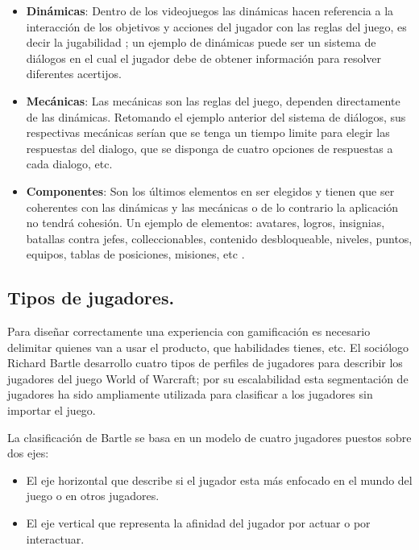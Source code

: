 	\begin{itemize}
		\item \textbf{Dinámicas}: Dentro de los videojuegos las dinámicas hacen 
		referencia a la interacción de los objetivos y acciones del jugador con las 
		reglas del juego, es decir la jugabilidad \cite{RefMecanica}; un ejemplo de 
		dinámicas puede ser un sistema de diálogos en el cual el jugador debe de 
		obtener información para resolver diferentes acertijos.

		\item \textbf{Mecánicas}: Las mecánicas son las reglas del juego, dependen 
		directamente de las dinámicas\cite{RefMecanica}. Retomando el ejemplo anterior 
		del sistema de diálogos, sus respectivas mecánicas serían que se tenga un 
		tiempo limite para elegir las respuestas del dialogo, que se disponga de cuatro 
		opciones de respuestas a cada dialogo, etc.

		\item \textbf{Componentes}: Son los últimos elementos en ser elegidos y 
		tienen que ser coherentes con las dinámicas y las mecánicas o de lo contrario 
		la aplicación no tendrá cohesión. Un ejemplo de elementos: avatares, logros, 
		insignias, batallas contra jefes, colleccionables, contenido desbloqueable, 
		niveles, puntos, equipos, tablas de posiciones, misiones, etc 
		\cite{RefIntroGamificacion}.
	\end{itemize}

\subsection{Tipos de jugadores.}
Para diseñar correctamente una experiencia con gamificación es necesario 
delimitar quienes van a usar el producto, que habilidades tienes, etc. El 
sociólogo Richard Bartle desarrollo cuatro tipos de perfiles de jugadores para 
describir los jugadores del juego World of Warcraft; por su escalabilidad esta 
segmentación de jugadores ha sido ampliamente utilizada para clasificar a los 
jugadores sin importar el juego.
\\
\par
La clasificación de Bartle se basa en un modelo de cuatro jugadores puestos sobre 
dos ejes: 
\begin{itemize}
	\item El eje horizontal que describe si el jugador esta más enfocado en el mundo 
	del juego o en otros jugadores.

	\item El eje vertical que representa la afinidad del jugador por actuar o 
	por interactuar.
\end{itemize}

